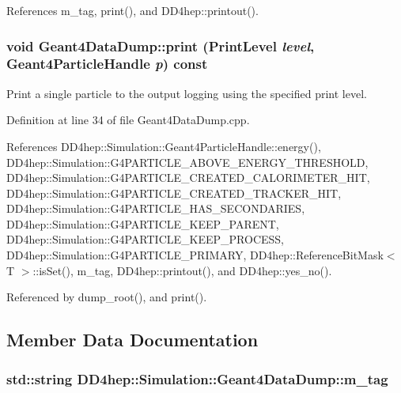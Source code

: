 References m\_\-tag, print(), and DD4hep::printout().\hypertarget{class_d_d4hep_1_1_simulation_1_1_geant4_data_dump_a2cfd1367725a0d6156c7a7195ec64ea1}{
\subsubsection[{print}]{\setlength{\rightskip}{0pt plus 5cm}void Geant4DataDump::print ({\bf PrintLevel} {\em level}, \/  {\bf Geant4ParticleHandle} {\em p}) const}}
\label{class_d_d4hep_1_1_simulation_1_1_geant4_data_dump_a2cfd1367725a0d6156c7a7195ec64ea1}


Print a single particle to the output logging using the specified print level. 

Definition at line 34 of file Geant4DataDump.cpp.

References DD4hep::Simulation::Geant4ParticleHandle::energy(), DD4hep::Simulation::G4PARTICLE\_\-ABOVE\_\-ENERGY\_\-THRESHOLD, DD4hep::Simulation::G4PARTICLE\_\-CREATED\_\-CALORIMETER\_\-HIT, DD4hep::Simulation::G4PARTICLE\_\-CREATED\_\-TRACKER\_\-HIT, DD4hep::Simulation::G4PARTICLE\_\-HAS\_\-SECONDARIES, DD4hep::Simulation::G4PARTICLE\_\-KEEP\_\-PARENT, DD4hep::Simulation::G4PARTICLE\_\-KEEP\_\-PROCESS, DD4hep::Simulation::G4PARTICLE\_\-PRIMARY, DD4hep::ReferenceBitMask$<$ T $>$::isSet(), m\_\-tag, DD4hep::printout(), and DD4hep::yes\_\-no().

Referenced by dump\_\-root(), and print().

\subsection{Member Data Documentation}
\hypertarget{class_d_d4hep_1_1_simulation_1_1_geant4_data_dump_a58986bd9d08cd72f5d5b780d0047e5e6}{
\subsubsection[{m\_\-tag}]{\setlength{\rightskip}{0pt plus 5cm}std::string {\bf DD4hep::Simulation::Geant4DataDump::m\_\-tag}}}
\label{class_d_d4hep_1_1_simulation_1_1_geant4_data_dump_a58986bd9d08cd72f5d5b780d0047e5e6}


